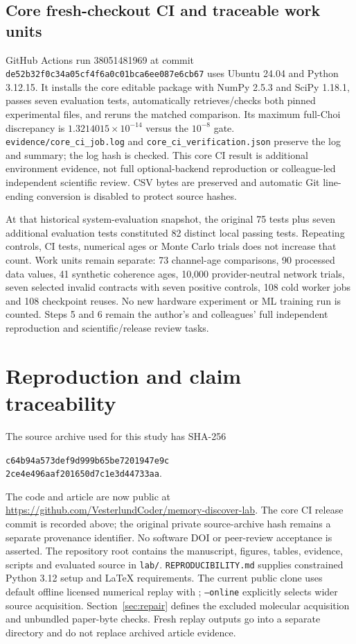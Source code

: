 \documentclass[10pt,a4paper]{article}
\newcommand{\code}[1]{\texttt{#1}}
\begin{document}
\subsection{Core fresh-checkout CI and traceable work units}
GitHub Actions run 38051481969 at commit \code{de52b32f0c34a05cf4f6a0c01bca6ee087e6cb67} uses Ubuntu 24.04 and Python 3.12.15. It installs the core editable package with NumPy 2.5.3 and SciPy 1.18.1, passes seven evaluation tests, automatically retrieves/checks both pinned experimental files, and reruns the matched comparison. Its maximum full-Choi discrepancy is $1.3214015\times10^{-14}$ versus the $10^{-8}$ gate. \code{evidence/core\_ci\_job.log} and \code{core\_ci\_verification.json} preserve the log and summary; the log hash is checked. This core CI result is additional environment evidence, not full optional-backend reproduction or colleague-led independent scientific review. CSV bytes are preserved and automatic Git line-ending conversion is disabled to protect source hashes.

At that historical system-evaluation snapshot, the original 75 tests plus seven additional evaluation tests constituted 82 distinct local passing tests. Repeating controls, CI tests, numerical ages or Monte Carlo trials does not increase that count. Work units remain separate: 73 channel-age comparisons, 90 processed data values, 41 synthetic coherence ages, 10,000 provider-neutral network trials, seven selected invalid contracts with seven positive controls, 108 cold worker jobs and 108 checkpoint reuses. No new hardware experiment or ML training run is counted. Steps 5 and 6 remain the author's and colleagues' full independent reproduction and scientific/release review tasks.

\section{Reproduction and claim traceability}
The source archive used for this study has SHA-256
\par\noindent\begin{minipage}{\linewidth}\centering\small\texttt{c64b94a573def9d999b65be7201947e9c}\\\texttt{2ce4e496aaf201650d7c1e3d44733aa}.\end{minipage}\par
The code and article are now public at \url{https://github.com/VesterlundCoder/memory-discover-lab}. The core CI release commit is recorded above; the original private source-archive hash remains a separate provenance identifier. No software DOI or peer-review acceptance is asserted.
The repository root contains the manuscript, figures, tables, evidence, scripts and evaluated source in \code{lab/}. \code{REPRODUCIBILITY.md} supplies constrained Python 3.12 setup and LaTeX requirements. The current public clone uses default offline licensed numerical replay with ; \code{--online} explicitly selects wider source acquisition. Section~\ref{sec:repair} defines the excluded molecular acquisition and unbundled paper-byte checks. Fresh replay outputs go into a separate directory and do not replace archived article evidence.
\end{document}

